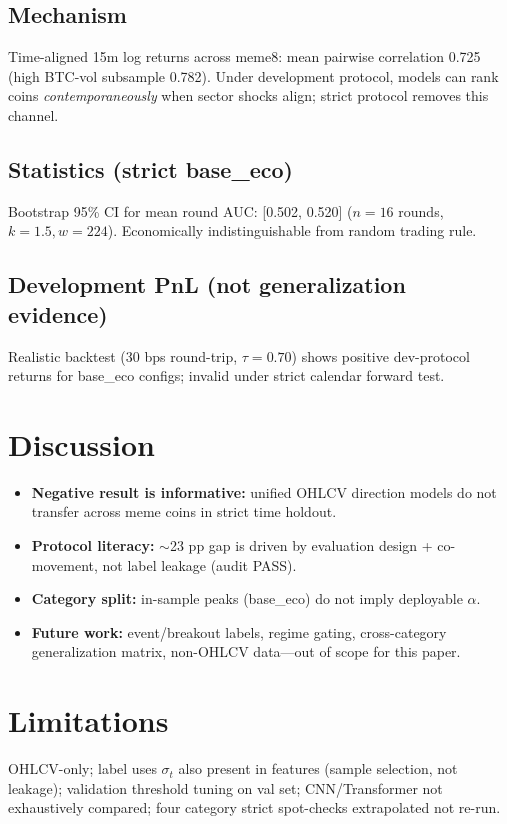 \documentclass[11pt,a4paper]{article}
\begin{document}
\subsection{Mechanism}
Time-aligned 15m log returns across meme8: mean pairwise correlation 0.725 (high BTC-vol
subsample 0.782). Under development protocol, models can rank coins \emph{contemporaneously}
when sector shocks align; strict protocol removes this channel.

\subsection{Statistics (strict base\_eco)}
Bootstrap 95\% CI for mean round AUC: [0.502, 0.520] ($n{=}16$ rounds, $k{=}1.5, w{=}224$).
Economically indistinguishable from random trading rule.

\subsection{Development PnL (not generalization evidence)}
Realistic backtest (30 bps round-trip, $\tau{=}0.70$) shows positive dev-protocol returns for
base\_eco configs; invalid under strict calendar forward test.

\section{Discussion}
\begin{itemize}
  \item \textbf{Negative result is informative:} unified OHLCV direction models do not transfer
        across meme coins in strict time holdout.
  \item \textbf{Protocol literacy:} $\sim$23 pp gap is driven by evaluation design + co-movement,
        not label leakage (audit PASS).
  \item \textbf{Category split:} in-sample peaks (base\_eco) do not imply deployable $\alpha$.
  \item \textbf{Future work:} event/breakout labels, regime gating, cross-category generalization
        matrix, non-OHLCV data---out of scope for this paper.
\end{itemize}

\section{Limitations}
OHLCV-only; label uses $\sigma_t$ also present in features (sample selection, not leakage);
validation threshold tuning on val set; CNN/Transformer not exhaustively compared; four category
strict spot-checks extrapolated not re-run.
\end{document}
